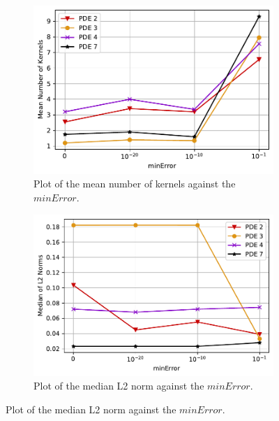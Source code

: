 \documentclass[./\jobname.tex]{subfiles}
\begin{document}
\begin{figure}[h]
	\centering
	\begin{subfigure}[b]{0.5\linewidth}
		\centering
		\includegraphics[width=1\textwidth]{../../code/experiments/misc/pde2347_minError_kernelNR.pdf}
		\caption{Plot of the mean number of kernels against the $minError$.}
		\label{fig:subexperiment_pde2347_minerror_kernelNR}
	\end{subfigure}%
	\begin{subfigure}[b]{0.52\linewidth}
		\centering
		\includegraphics[width=1\textwidth]{../../code/experiments/misc/pde2347_minError_L2norm.pdf}
		\caption{Plot of the median L2 norm against the $minError$.}
		\label{fig:subexperiment_pde2347_minerror_l2norm}
	\end{subfigure}%
	\label{fig:subexperiment_pde2347_minerror}
\end{figure}
\end{document}
